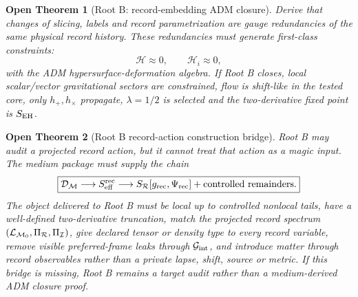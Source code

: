 \documentclass[11pt]{article}
\newtheorem{openthm}{Open Theorem}
\begin{document}
\begin{openthm}[Root B: record-embedding ADM closure]
Derive that changes of slicing, labels and record parametrization are gauge
redundancies of the same physical record history.  These redundancies must
generate first-class constraints:
\[
\boxed{
\mathcal H\approx0,
\qquad
\mathcal H_i\approx0,
}
\]
with the ADM hypersurface-deformation algebra.  If Root B closes, local
scalar/vector gravitational sectors are constrained, flow is shift-like in the
tested core, only \(h_+,h_\times\) propagate, \(\lambda=1/2\) is selected and
the two-derivative fixed point is \(S_{\rm EH}\).
\end{openthm}

\begin{openthm}[Root B record-action construction bridge]
Root B may audit a projected record action, but it cannot treat that action as
a magic input.  The medium package must supply the chain
\[
\boxed{
\mathcal D_{\mathcal M}
\longrightarrow
S_{\rm eff}^{\rm rec}
\longrightarrow
S_{\mathcal R}[g_{\rm rec},\Psi_{\rm rec}]
+\text{controlled remainders}.
}
\]
The object delivered to Root B must be local up to controlled nonlocal tails,
have a well-defined two-derivative truncation, match the projected record
spectrum \(({\cal L}_{\mathcal M_0},\Pi_{\mathcal R},\Pi_{\mathcal I})\), give
declared tensor or density type to every record variable, remove visible
preferred-frame leaks through \(\mathcal G_{\rm int}\), and introduce matter
through record observables rather than a private lapse, shift, source or
metric.  If this bridge is missing, Root B remains a target audit rather than
a medium-derived ADM closure proof.
\end{openthm}
\end{document}
